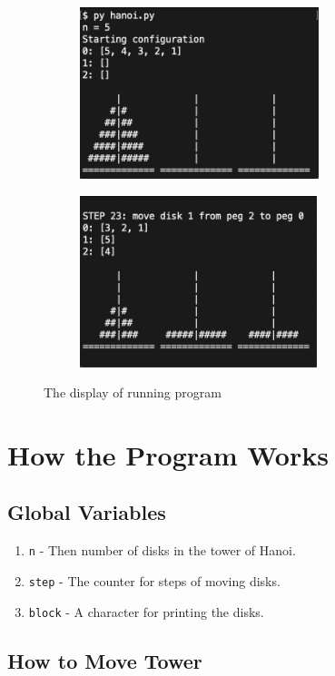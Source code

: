 \documentclass[12pt]{article}
\begin{document}
	\begin{figure}[ht]
		\centering
		\begin{subfigure}{.5\textwidth}
	    	\centering
		    \includegraphics[height=5cm]{RunProg1.png}
		\end{subfigure}%
		\begin{subfigure}{.5\textwidth}
		    \centering
		    \includegraphics[height=5cm]{RunProg2.png}
		\end{subfigure}
		\caption{The display of running program}
		\label{fig:runProg}
	\end{figure}

\section{How the Program Works}\label{sec:how}

	\subsection{Global Variables}

		\begin{enumerate}
			\item \texttt{n} - Then number of disks in the tower of Hanoi.
			\item \texttt{step} - The counter for steps of moving disks. 
			\item \texttt{block} - A character for printing the disks.
		\end{enumerate}
	
	\subsection{How to Move Tower}
	
\end{document}
